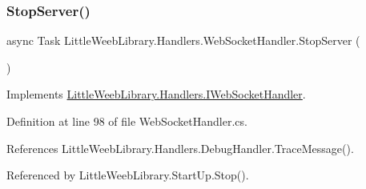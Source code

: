 \subsubsection{\texorpdfstring{Stop\+Server()}{StopServer()}}
{\footnotesize\ttfamily async Task Little\+Weeb\+Library.\+Handlers.\+Web\+Socket\+Handler.\+Stop\+Server (\begin{DoxyParamCaption}{ }\end{DoxyParamCaption})}



Implements \mbox{\hyperlink{interface_little_weeb_library_1_1_handlers_1_1_i_web_socket_handler_a69aca27030b0df701d7ce57ba2545cb1}{Little\+Weeb\+Library.\+Handlers.\+I\+Web\+Socket\+Handler}}.



Definition at line 98 of file Web\+Socket\+Handler.\+cs.



References Little\+Weeb\+Library.\+Handlers.\+Debug\+Handler.\+Trace\+Message().



Referenced by Little\+Weeb\+Library.\+Start\+Up.\+Stop().


